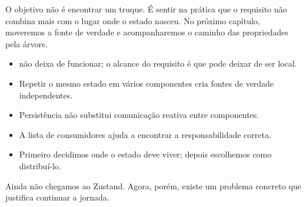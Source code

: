 
O objetivo não é encontrar um truque. É sentir na prática que o requisito não
combina mais com o lugar onde o estado nasceu. No próximo capítulo, moveremos a
fonte de verdade e acompanharemos o caminho das propriedades pela árvore.

\begin{resumo}
\begin{itemize}
  \item {} não deixa de funcionar; o alcance do requisito é que
    pode deixar de ser local.
  \item Repetir o mesmo estado em vários componentes cria fontes de verdade
    independentes.
  \item Persistência não substitui comunicação reativa entre componentes.
  \item A lista de consumidores ajuda a encontrar a responsabilidade correta.
  \item Primeiro decidimos onde o estado deve viver; depois escolhemos como
    distribuí-lo.
\end{itemize}
\end{resumo}

Ainda não chegamos ao Zustand. Agora, porém, existe um problema concreto que
justifica continuar a jornada.
